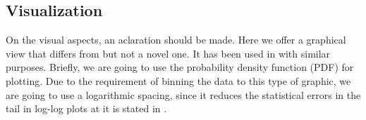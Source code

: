 \documentclass[conference]{IEEEtran}
\begin{document}
\subsection{Visualization}
 
On the visual aspects, an aclaration should be made. Here we offer a graphical view that differs from \cite{merelo2017self}
but not a novel one. It has been used in \cite{arafat2009commit} with similar purposes. 
Briefly, we are going to use the probability density function (PDF) for plotting. Due to the 
requirement of binning the data to this type of graphic, we are going to use a
logarithmic spacing, since it reduces the statistical errors in the tail in log-log 
plots at it is stated in \cite{newman2005power}.


\end{document}
